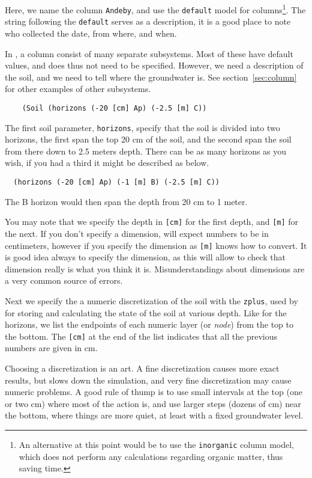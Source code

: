 \documentclass[a4paper,11pt]{article}
\begin{document}
Here, we name the column \texttt{Andeby}, and use the \texttt{default}
model for \daisy{} columns\footnote{An alternative at this point would
  be to use the \texttt{inorganic} column model, which does not
  perform any calculations regarding organic matter, thus saving
  time.}.  The string following the \texttt{default} serves as a
description, it is a good place to note who collected the date, from
where, and when.

In \daisy{}, a column consist of many separate subsystems.  Most of
these have default values, and does thus not need to be specified.
However, we need a description of the soil, and we need to tell
\daisy{} where the groundwater is.  See section~\ref{sec:column} for
other examples of other subsystems.

\begin{verbatim}
    (Soil (horizons (-20 [cm] Ap) (-2.5 [m] C))
\end{verbatim}
The first soil parameter, \texttt{horizons}, specify that the soil is
divided into two horizons, the first span the top 20 cm of the soil,
and the second span the soil from there down to 2.5 meters depth.
There can be as many horizons as you wish, if you had a third it might
be described as below.

\begin{verbatim}
  (horizons (-20 [cm] Ap) (-1 [m] B) (-2.5 [m] C))
\end{verbatim}

The B horizon would then span the depth from 20 cm to 1
meter.

You may note that we specify the depth in \verb|[cm]| for the first
depth, and \verb|[m]| for the next.  If you don't specify a dimension,
\daisy{} will expect numbers to be in centimeters, however if you
specify the dimension as \verb|[m]| knows how to convert.  It is good
idea always to specify the dimension, as this will allow \daisy{} to
check that dimension really is what you think it is.
Misunderstandings about dimensions are a very common source of errors.

Next we specify the a numeric discretization of the soil with the
\texttt{zplus}, used by \daisy{} for storing and calculating the state
of the soil at various depth.  Like for the horizons, we list the
endpoints of each numeric layer (or \emph{node}) from the top to the
bottom.  The \verb|[cm]| at the end of the list indicates that all the
previous numbers are given in cm.

Choosing a discretization is an art.  A fine discretization causes more
exact results, but slows down the simulation, and very fine
discretization may cause numeric problems.  A good rule of thump is to
use small intervals at the top (one or two cm) where most of the
action is, and use larger steps (dozens of cm) near the bottom, where
things are more quiet, at least with a fixed groundwater level.
\end{document}
